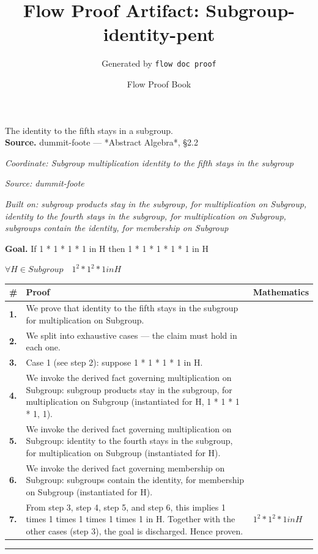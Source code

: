 \documentclass[11pt]{article}
\title{Flow Proof Artifact: Subgroup-identity-pent}
\author{Generated by \texttt{flow doc proof}}
\date{Flow Proof Book}
\theoremstyle{definition}
\begin{document}
\maketitle
The identity to the fifth stays in a subgroup.\\[0.5em]
\textbf{Source.} dummit-foote — *Abstract Algebra*, §2.2\\[0.5em]
\bigskip
{}\par
\smallskip\noindent\textit{Coordinate: Subgroup \cdot multiplication \cdot identity to the fifth stays in the subgroup}\par
\smallskip\noindent\textit{Source: dummit-foote}\par
\smallskip\noindent\textit{Built on: subgroup products stay in the subgroup, for multiplication on Subgroup, identity to the fourth stays in the subgroup, for multiplication on Subgroup, subgroups contain the identity, for membership on Subgroup}\par
\medskip
\noindent\textbf{Goal.} If 1 * 1 * 1 * 1 in H then 1 * 1 * 1 * 1 * 1 in H\par
\noindent$\displaystyle \forall H \in Subgroup\quad 1^{2} * 1^{2} * 1 in H$\par
\medskip
\noindent
\begin{tabular}{@{} >{\raggedright\arraybackslash}p{} >{\raggedright\arraybackslash}p{} >{\raggedleft\arraybackslash}p{} @{}}
\textbf{\#} & \textbf{Proof} & \textbf{Mathematics} \\
\midrule
\textbf{1.} & We prove that identity to the fifth stays in the subgroup for multiplication on Subgroup. & \\[0.45em]
\textbf{2.} & We split into exhaustive cases — the claim must hold in each one. & \\[0.45em]
\textbf{3.} & Case 1 (see step 2): suppose 1 * 1 * 1 * 1 in H. & \\[0.45em]
\textbf{4.} & We invoke the derived fact governing multiplication on Subgroup: subgroup products stay in the subgroup, for multiplication on Subgroup (instantiated for H, 1 * 1 * 1 * 1, 1). & \\[0.45em]
\textbf{5.} & We invoke the derived fact governing multiplication on Subgroup: identity to the fourth stays in the subgroup, for multiplication on Subgroup (instantiated for H). & \\[0.45em]
\textbf{6.} & We invoke the derived fact governing membership on Subgroup: subgroups contain the identity, for membership on Subgroup (instantiated for H). & \\[0.45em]
\textbf{7.} & From step 3, step 4, step 5, and step 6, this implies 1 times 1 times 1 times 1 times 1 in H. Together with the other cases (step 3), the goal is discharged. Hence proven. & $\displaystyle 1^{2} * 1^{2} * 1 in H$ \\[0.45em]
\bottomrule
\end{tabular}
\label{thm:Subgroup-multiplication-identity_to_the_fifth_stays_in_the_subgroup}
\par\medskip\hrule
\end{document}
